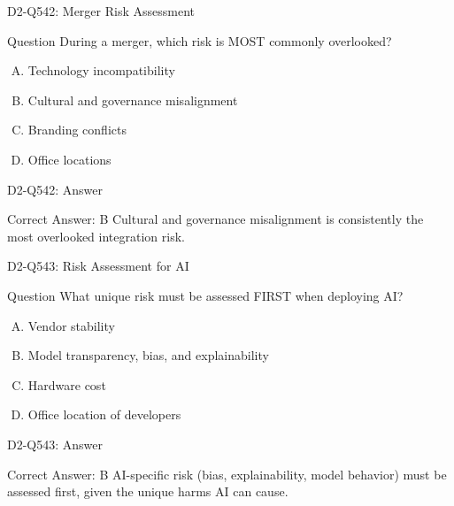\documentclass{beamer}
\begin{document}
\begin{frame}{D2-Q542: Merger Risk Assessment}
	\begin{block}{Question}
		During a merger, which risk is MOST commonly overlooked?
	\end{block}
	\begin{enumerate}[(A)]
		\item Technology incompatibility
		\item Cultural and governance misalignment
		\item Branding conflicts
		\item Office locations
	\end{enumerate}
\end{frame}
\begin{frame}{D2-Q542: Answer}
	\begin{block}{Correct Answer: B}
		Cultural and governance misalignment is consistently the most overlooked integration risk.
	\end{block}
\end{frame}

\begin{frame}{D2-Q543: Risk Assessment for AI}
	\begin{block}{Question}
		What unique risk must be assessed FIRST when deploying AI?
	\end{block}
	\begin{enumerate}[(A)]
		\item Vendor stability
		\item Model transparency, bias, and explainability
		\item Hardware cost
		\item Office location of developers
	\end{enumerate}
\end{frame}
\begin{frame}{D2-Q543: Answer}
	\begin{block}{Correct Answer: B}
		AI-specific risk (bias, explainability, model behavior) must be assessed first, given the unique harms AI can cause.
	\end{block}
\end{frame}
\end{document}
